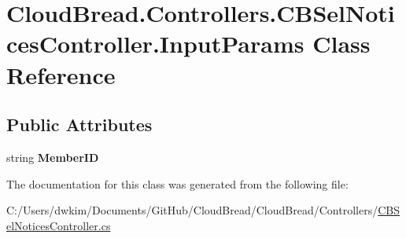 \hypertarget{a00100}{}\section{Cloud\+Bread.\+Controllers.\+C\+B\+Sel\+Notices\+Controller.\+Input\+Params Class Reference}
\label{a00100}
\subsection*{Public Attributes}
\begin{DoxyCompactItemize}
\item 
string {\bfseries Member\+ID}\hypertarget{a00100_ac0bc4a10cd8174435a4f4065a2861c4f}{}\label{a00100_ac0bc4a10cd8174435a4f4065a2861c4f}

\end{DoxyCompactItemize}


The documentation for this class was generated from the following file\+:\begin{DoxyCompactItemize}
\item 
C\+:/\+Users/dwkim/\+Documents/\+Git\+Hub/\+Cloud\+Bread/\+Cloud\+Bread/\+Controllers/\hyperlink{a00225}{C\+B\+Sel\+Notices\+Controller.\+cs}\end{DoxyCompactItemize}
